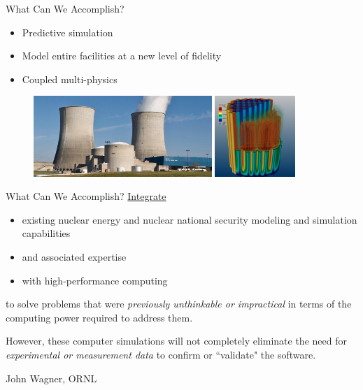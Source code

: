\documentclass[xcolor=x11names,compress]{beamer}
\renewcommand{\(}{\begin{columns}}
\renewcommand{\)}{\end{columns}}
\newcommand{\<}[1]{\begin{column}{#1}}
\renewcommand{\>}{\end{column}}
\begin{document}
\begin{frame}{What Can We Accomplish?}
\begin{itemize}
\item Predictive simulation 
\item Model entire facilities at a new level of fidelity
\item Coupled multi-physics
\end{itemize}
\begin{figure}
\includegraphics[height=1.2in,clip]{../figs/WattsBar}
\hfill
\includegraphics[height=1.2in,clip]{../figs/DenovoCore}
\end{figure}
\end{frame}

\begin{frame}{What Can We Accomplish?}
\underline{Integrate}
\begin{itemize}
\item existing nuclear energy and nuclear national security modeling and simulation capabilities
\item and associated expertise
\item with high-performance computing
\end{itemize}    
to solve problems that were \emph{previously unthinkable or impractical} in terms of the computing power required to address them.

\vspace*{1em}
However, these computer simulations will not completely eliminate the need for \emph{experimental or measurement data} to confirm or ``validate" the software. 

\vspace*{1em}
\hspace*{0.25 in} John Wagner, ORNL
\end{frame}
\end{document}
